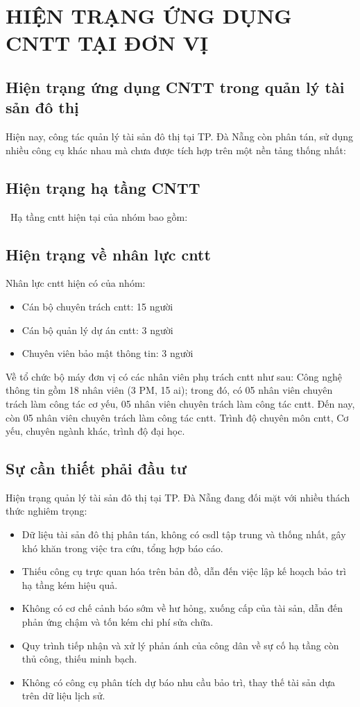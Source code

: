 \section{HIỆN TRẠNG ỨNG DỤNG CNTT TẠI ĐƠN VỊ}
\subsection{ Hiện trạng ứng dụng CNTT trong quản lý tài sản đô thị}
Hiện nay, công tác quản lý tài sản đô thị tại TP. Đà Nẵng còn phân tán, sử dụng nhiều công cụ khác nhau mà chưa được tích hợp trên một nền tảng thống nhất:

\subsection{Hiện trạng hạ tầng CNTT}\
Hạ tầng \gls{cntt} hiện tại của nhóm bao gồm:

\subsection{Hiện trạng về nhân lực \gls{cntt}}
Nhân lực \gls{cntt} hiện có của nhóm:
\begin{itemize}
    \item Cán bộ chuyên trách \gls{cntt}: 15 người
    \item Cán bộ quản lý dự án \gls{cntt}: 3 người
    \item Chuyên viên bảo mật thông tin: 3 người
\end{itemize}

Về tổ chức bộ máy đơn vị có các nhân viên phụ trách \gls{cntt} như sau: Công nghệ thông tin gồm 18 nhân viên (3 PM, 15 \gls{ai}); trong đó, có 05 nhân viên chuyên trách làm công tác cơ yếu, 05 nhân viên chuyên trách làm công tác \gls{cntt}. Đến nay, còn 05 nhân viên chuyên trách làm công tác \gls{cntt}. Trình độ chuyên môn \gls{cntt}, Cơ yếu, chuyên ngành khác, trình độ đại học. 

\subsection{Sự cần thiết phải đầu tư}
Hiện trạng quản lý tài sản đô thị tại TP. Đà Nẵng đang đối mặt với nhiều thách thức nghiêm trọng:
\begin{itemize}
    \item Dữ liệu tài sản đô thị phân tán, không có \gls{csdl} tập trung và thống nhất, gây khó khăn trong việc tra cứu, tổng hợp báo cáo.
    \item Thiếu công cụ trực quan hóa trên bản đồ, dẫn đến việc lập kế hoạch bảo trì hạ tầng kém hiệu quả.
    \item Không có cơ chế cảnh báo sớm về hư hỏng, xuống cấp của tài sản, dẫn đến phản ứng chậm và tốn kém chi phí sửa chữa.
    \item Quy trình tiếp nhận và xử lý phản ánh của công dân về sự cố hạ tầng còn thủ công, thiếu minh bạch.
    \item Không có công cụ phân tích dự báo nhu cầu bảo trì, thay thế tài sản dựa trên dữ liệu lịch sử.
\end{itemize}

